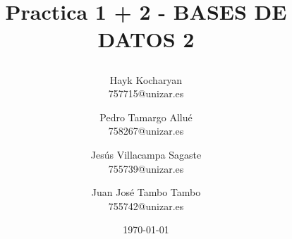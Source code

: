 \documentclass{article}
\begin{document}
\begin{titlepage}
	\title{
		\begin{Huge}
			Practica 1 + 2 - BASES DE DATOS 2
		\end{Huge}
	}
	\author{
	  Hayk Kocharyan\\
	  757715@unizar.es
	  \and
	  Pedro Tamargo Allué\\
	  758267@unizar.es
	  \and
	  Jesús Villacampa Sagaste\\
	  755739@unizar.es
	  \and
	  Juan José Tambo Tambo\\
	  755742@unizar.es
	}
	\date{\today}
	
	\clearpage\maketitle
	\thispagestyle{empty}
	\tableofcontents
	\listoffigures 
	
\end{titlepage}

\newpage 
\end{document}
